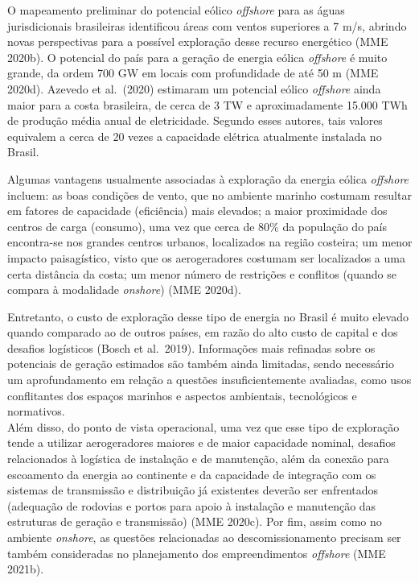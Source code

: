 \documentclass[
  oneside]{scrbook}
\begin{document}
O mapeamento preliminar do potencial eólico \emph{offshore} para as águas jurisdicionais brasileiras identificou áreas com ventos superiores a 7 m/s, abrindo novas perspectivas para a possível exploração desse recurso energético (MME 2020b). O potencial do país para a geração de energia eólica \emph{offshore} é muito grande, da ordem 700 GW em locais com profundidade de até 50 m (MME 2020d). Azevedo et al.~(2020) estimaram um potencial eólico \emph{offshore} ainda maior para a costa brasileira, de cerca de 3 TW e aproximadamente 15.000 TWh de produção média anual de eletricidade. Segundo esses autores, tais valores equivalem a cerca de 20 vezes a capacidade elétrica atualmente instalada no Brasil.

Algumas vantagens usualmente associadas à exploração da energia eólica \emph{offshore} incluem: as boas condições de vento, que no ambiente marinho costumam resultar em fatores de capacidade (eficiência) mais elevados; a maior proximidade dos centros de carga (consumo), uma vez que cerca de 80\% da população do país encontra-se nos grandes centros urbanos, localizados na região costeira; um menor impacto paisagístico, visto que os aerogeradores costumam ser localizados a uma certa distância da costa; um menor número de restrições e conflitos (quando se compara à modalidade \emph{onshore}) (MME 2020d).

Entretanto, o custo de exploração desse tipo de energia no Brasil é muito elevado quando comparado ao de outros países, em razão do alto custo de capital e dos desafios logísticos (Bosch et al.~2019). Informações mais refinadas sobre os potenciais de geração estimados são também ainda limitadas, sendo necessário um aprofundamento em relação a questões insuficientemente avaliadas, como usos conflitantes dos espaços marinhos e aspectos ambientais, tecnológicos e normativos.\\
Além disso, do ponto de vista operacional, uma vez que esse tipo de exploração tende a utilizar aerogeradores maiores e de maior capacidade nominal, desafios relacionados à logística de instalação e de manutenção, além da conexão para escoamento da energia ao continente e da capacidade de integração com os sistemas de transmissão e distribuição já existentes deverão ser enfrentados (adequação de rodovias e portos para apoio à instalação e manutenção das estruturas de geração e transmissão) (MME 2020c). Por fim, assim como no ambiente \emph{onshore}, as questões relacionadas ao descomissionamento precisam ser também consideradas no planejamento dos empreendimentos \emph{offshore} (MME 2021b).
\end{document}
